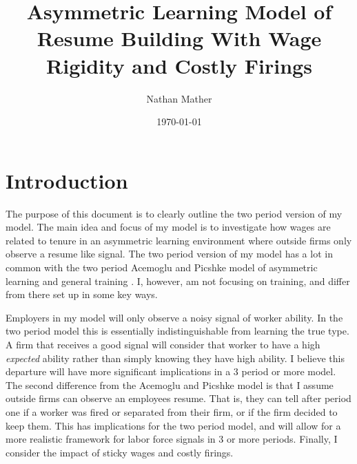 \documentclass[11pt]{article}
\title{Asymmetric Learning Model of Resume Building With Wage Rigidity and Costly Firings} %
\author{Nathan Mather} %
\date{\today} %
\begin{document}
	
	
	\maketitle %
	
	\setcounter{tocdepth}{3} %
	
	\tableofcontents %
	
	\section{Introduction}
	The purpose of this document is to clearly outline the two period version of my model. The main idea and focus of my model is to investigate how wages are related to tenure in an asymmetric learning environment where outside firms only observe a resume like signal. The two period version of my model has a lot in common with the two period Acemoglu and Picshke model of asymmetric learning and general training \cite{AP_1998}. I, however, am not focusing on training, and differ from there set up in some key ways. \par
	
	Employers in my model will only observe a noisy signal of worker ability. In the two period model this is essentially indistinguishable from learning the true type. A firm that receives a good signal will consider that worker to have a high \textit{expected} ability rather than simply knowing they have high ability. I believe this departure will have more significant implications in a 3 period or more model. The second difference from the Acemoglu and Picshke model is that I assume outside firms can observe an employees resume. That is,  they can tell after period one if a worker was fired or separated from their firm, or if the firm decided to keep them. This has implications for the two period model, and will allow for a more realistic framework for labor force signals in 3 or more periods. Finally, I consider the impact of sticky wages and costly firings.  \par 
\end{document}
